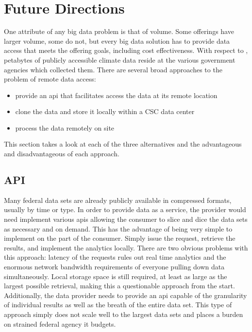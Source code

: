 \section{Future Directions}
One attribute of any big data problem is that of volume. Some offerings have larger volume, some do not, but every big data solution  has to provide data access that meets the offering goals, including cost effectiveness. With respect to \climatedge, petabytes of publicly accessible climate data reside at the various  government agencies which collected them. There are several broad approaches to the problem of remote data access:
\begin{itemize}
    \item provide an \gls{api} that facilitates access the data at its remote location
    \item clone the data and store it locally within a \textsc{CSC} data center
    \item process the data remotely on site
\end{itemize}
This section takes a look at each of the three alternatives and the advantageous and disadvantageous of each approach.
\subsection{API}
Many federal data sets are already publicly available in compressed formats, usually by time or type. In order to provide data as a service, the provider would need implement various \gls{api}s allowing the consumer to slice and dice the data sets as necessary and on demand. This has the advantage of being very simple to implement on the part of the consumer. Simply issue the request, retrieve the results, and implement the analytics locally. There are two obvious problems with this approach: latency of the requests rules out real time analytics and the enormous network bandwidth requirements of everyone pulling down data simultaneously. Local storage space is still required, at least as large as the largest possible retrieval, making this a questionable approach from the start. Additionally, the data provider needs to provide an \gls{api} capable of the granularity of individual results as well as the breath of the entire data set. This type of approach simply does not scale well to the largest data sets and places a burden on strained federal agency \gls{it} budgets.
